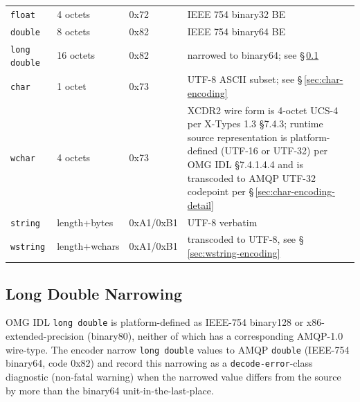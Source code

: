 \documentclass{../styles/zerodds-vendor-spec}
\begin{document}
\begin{longtable}{p{3.0cm}p{1.8cm}p{3.6cm}p{3.2cm}}
  \texttt{float}                & 4 octets      & \textsf{0x72}                                                                    & IEEE 754 binary32 BE \\
  \texttt{double}               & 8 octets      & \textsf{0x82}                                                                    & IEEE 754 binary64 BE \\
  \texttt{long double}          & 16 octets     & \textsf{0x82}                                                                    & narrowed to binary64; see \S\,\ref{sec:long-double-narrowing} \\
  \texttt{char}                 & 1 octet       & \textsf{0x73}                                                                    & UTF-8 ASCII subset; see \S\,\ref{sec:char-encoding} \\
  \texttt{wchar}                & 4 octets      & \textsf{0x73}                                                                    & XCDR2 wire form is 4-octet UCS-4 per X-Types 1.3 §7.4.3; runtime source representation is platform-defined (UTF-16 or UTF-32) per OMG IDL §7.4.1.4.4 and is transcoded to AMQP UTF-32 codepoint per \S\,\ref{sec:char-encoding-detail} \\
  \texttt{string}               & length+bytes  & \textsf{0xA1}\enspace/\enspace\textsf{0xB1}                                       & UTF-8 verbatim \\
  \texttt{wstring}              & length+wchars & \textsf{0xA1}\enspace/\enspace\textsf{0xB1}                                       & transcoded to UTF-8, see \S\,\ref{sec:wstring-encoding} \\
  \bottomrule
\end{longtable}

\subsection{Long Double Narrowing}\label{sec:long-double-narrowing}

OMG IDL \texttt{long double} is platform-defined as IEEE-754
binary128 or x86-extended-precision (binary80), neither of which
has a corresponding AMQP-1.0 wire-type. The encoder 
narrow \texttt{long double} values to AMQP \texttt{double}
(IEEE-754 binary64, code \textsf{0x82}) and  record
this narrowing as a \texttt{decode-error}-class diagnostic
(non-fatal warning) when the narrowed value differs from the
source by more than the binary64 unit-in-the-last-place.
\end{document}
